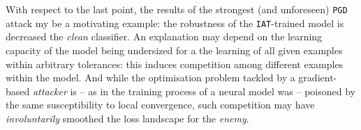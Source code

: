 With respect to the last point, the results of the strongest (and unforeseen) \texttt{PGD} attack my be a motivating example: the robustness of the \texttt{IAT}-trained model is decreased \wrt the \textit{clean} classifier. An explanation may depend on the learning capacity of the model being undersized for a the learning of all given examples within arbitrary tolerances: this induces competition among different examples within the model. And while the optimisation problem tackled by a gradient-based \textit{attacker} is -- as in the training process of a neural model was -- poisoned by the same susceptibility to local convergence, such competition may have \textit{involuntarily} smoothed the loss landscape for the \textit{enemy}.
